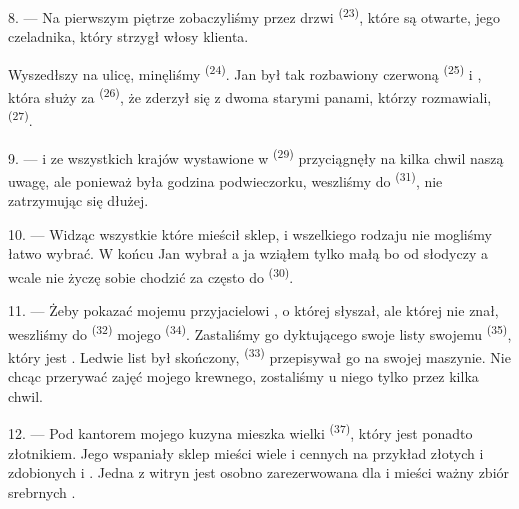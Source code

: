 8. --- Na pierwszym piętrze zobaczyliśmy przez drzwi 
\textsuperscript{(23)}, które są otwarte, jego czeladnika, który strzygł włosy klienta.

Wyszedłszy na ulicę, minęliśmy  \textsuperscript{(24)}. Jan był
tak rozbawiony czerwoną  \textsuperscript{(25)} i ,
która służy za  \textsuperscript{(26)}, że zderzył się z dwoma starymi
panami, którzy rozmawiali,  \textsuperscript{(27)}.

\VUsaut{3.0mm}

9. ---  i  ze wszystkich krajów wystawione w
  \textsuperscript{(29)} przyciągnęły na kilka chwil
naszą uwagę, ale ponieważ była godzina podwieczorku, weszliśmy do 
\textsuperscript{(31)}, nie zatrzymując się dłużej.

10. --- Widząc wszystkie  które mieścił sklep,  i wszelkiego rodzaju  nie mogliśmy łatwo wybrać.
W końcu Jan wybrał  a ja wziąłem tylko małą  bo od słodyczy  a wcale nie życzę sobie chodzić za
często do  \textsuperscript{(30)}.

\VUsaut{3.0mm}

11. --- Żeby pokazać mojemu przyjacielowi , o której słyszał,
ale której nie znał, weszliśmy do  \textsuperscript{(32)} mojego
 \textsuperscript{(34)}. Zastaliśmy go dyktującego swoje listy swojemu
 \textsuperscript{(35)}, który jest . Ledwie
list był skończony,  \textsuperscript{(33)} przepisywał go na swojej
maszynie. Nie chcąc przerywać zajęć mojego krewnego, zostaliśmy u niego tylko przez
kilka chwil.

12. --- Pod kantorem mojego kuzyna mieszka wielki 
\textsuperscript{(37)}, który jest ponadto złotnikiem. Jego wspaniały sklep mieści wiele
  i
cennych  na przykład  złotych
 i  zdobionych  i . Jedna z witryn jest osobno zarezerwowana dla
 i mieści ważny zbiór srebrnych .

